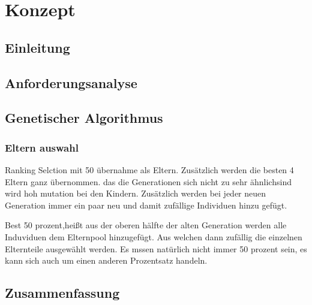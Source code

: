 \section{Konzept}
\subsection{Einleitung}

\subsection{Anforderungsanalyse}



\subsection{Genetischer Algorithmus}
\subsubsection{Eltern auswahl} 
Ranking Selction mit 50 übernahme als Eltern.
Zusätzlich werden die besten 4 Eltern ganz übernommen. das die Generationen sich nicht zu sehr ähnlichsind wird hoh mutation bei den Kindern. Zusätzlich werden bei jeder neuen Generation immer ein paar neu und damit zufällige Individuen hinzu gefügt. 

Best 50 prozent,heißt aus der oberen hälfte der alten Generation werden alle Induviduen dem Elternpool hinzugefügt. Aus welchen dann zufällig die einzelnen Elternteile ausgewählt werden. Es mssen natürlich nicht immer 50 prozent sein, es kann sich auch um einen anderen Prozentsatz handeln.


\subsection{Zusammenfassung}